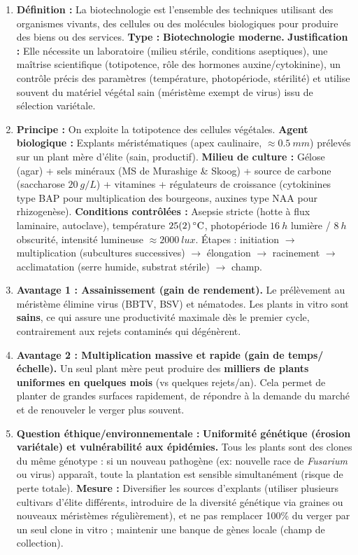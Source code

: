 \documentclass[11pt]{article}
\newcommand{\cle}[1]{{\popxbold\color{popdark}#1}}
\begin{document}
\begin{corrige}
\begin{enumerate}
\item \textbf{Définition :} La \cle{biotechnologie} est l'ensemble des techniques utilisant des organismes vivants, des cellules ou des molécules biologiques pour produire des biens ou des services. \textbf{Type :} \textbf{\cle{Biotechnologie moderne.}} \textbf{Justification :} Elle nécessite un laboratoire (milieu stérile, conditions aseptiques), une maîtrise scientifique (totipotence, rôle des hormones auxine/cytokinine), un contrôle précis des paramètres (température, photopériode, stérilité) et utilise souvent du matériel végétal sain (méristème exempt de virus) issu de sélection variétale.
\item \textbf{Principe :} On exploite la \cle{totipotence} des cellules végétales. \textbf{Agent biologique :} Explants méristématiques (apex caulinaire, $\approx \SI{0,5}{mm}$) prélevés sur un plant mère d'élite (sain, productif). \textbf{Milieu de culture :} Gélose (agar) + sels minéraux (MS de Murashige \& Skoog) + source de carbone (saccharose $\SI{20}{g/L}$) + vitamines + régulateurs de croissance (cytokinines type BAP pour multiplication des bourgeons, auxines type NAA pour rhizogenèse). \textbf{Conditions contrôlées :} Asepsie stricte (hotte à flux laminaire, autoclave), température $\SI{25 \pm 2}{\celsius}$, photopériode $\SI{16}{h}$ lumière / $\SI{8}{h}$ obscurité, intensité lumineuse $\approx \SI{2000}{lux}$. Étapes : initiation $\rightarrow$ multiplication (subcultures successives) $\rightarrow$ élongation $\rightarrow$ racinement $\rightarrow$ acclimatation (serre humide, substrat stérile) $\rightarrow$ champ.
\item \textbf{Avantage 1 : Assainissement (gain de rendement).} Le prélèvement au méristème élimine virus (BBTV, BSV) et nématodes. Les plants in vitro sont \textbf{sains}, ce qui assure une productivité maximale dès le premier cycle, contrairement aux rejets contaminés qui dégénèrent.
\item \textbf{Avantage 2 : Multiplication massive et rapide (gain de temps/échelle).} Un seul plant mère peut produire des \textbf{milliers de plants uniformes en quelques mois} (vs quelques rejets/an). Cela permet de planter de grandes surfaces rapidement, de répondre à la demande du marché et de renouveler le verger plus souvent.
\item \textbf{Question éthique/environnementale :} \textbf{Uniformité génétique (érosion variétale) et vulnérabilité aux épidémies.} Tous les plants sont des clones du même génotype : si un nouveau pathogène (ex: nouvelle race de \emph{Fusarium} ou virus) apparaît, toute la plantation est sensible simultanément (risque de perte totale). \textbf{Mesure :} Diversifier les sources d'explants (utiliser plusieurs cultivars d'élite différents, introduire de la diversité génétique via graines ou nouveaux méristèmes régulièrement), et ne pas remplacer 100\% du verger par un seul clone in vitro ; maintenir une banque de gènes locale (champ de collection).
\end{enumerate}
\end{corrige}
\end{document}
